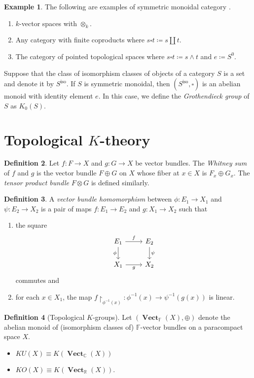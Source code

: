 \documentclass[10pt,letterpaper,cm]{nupset}
\theoremstyle{definition}
\newtheorem{definition}{Definition}[section]
\newtheorem{exmp}[definition]{Example}
\theoremstyle{theorem}
\theoremstyle{remark}
\newcommand{\C}{\mathbb C}
\newcommand{\F}{\mathbb F}
\newcommand{\R}{\mathbb R}
\newcommand{\1}{\mathbf{1}}
\newcommand{\0}{\vec 0}
\DeclareMathOperator{\iso}{iso}
\DeclareMathOperator{\vect}{\mathbf{Vect}}
\begin{document}
\begin{exmp} The following are examples of symmetric monoidal category	.
\begin{enumerate}
\item $k$-vector spaces with $\otimes_k$.
\item Any category with finite coproducts where $s \square t\coloneqq s \amalg t$.
\item The category of pointed topological spaces where $s \square t \coloneqq s \wedge t $ and $e\coloneqq S^0$.
\end{enumerate} 
\end{exmp}

Suppose that the class of isomorphism classes of objects of a category $S$ is a set and denote it by $S^{\iso}$. If $S$ is symmetric monoidal, then $\left(S^{\iso}, \square\right)$ is an abelian monoid with identity element $e$. In this case, we define the \textit{Grothendieck group} of $S$ as $K_0(S)$.

\section{Topological $K$-theory}

\begin{definition}
Let $f: F \to X$ and $g: G \to X$ be vector bundles. The \textit{Whitney sum} of $f$ and $g$ is the vector bundle $F \oplus G$ on $X$ whose fiber at $x \in X$ is $F_x \oplus G_x$.  The \textit{tensor product bundle} $F \otimes G$ is defined similarly.
\end{definition}

\begin{definition}
A \textit{vector bundle homomorphism} between $\phi : E_1 \to X_1$ and $\psi : E_2 \to X_2$ is a pair of maps $f: E_1 \to E_2$ and $g: X_1 \to X_2$ such that
\begin{enumerate}[label=(\roman*)]
\item the square
\[
\begin{tikzcd}
E_1 \arrow[r, "f"] \arrow[d, "\phi"'] & E_2 \arrow[d, "\psi"] \\
X_1 \arrow[r, "g"'] & X_2
\end{tikzcd}
\] commutes and
\item for each $x \in X_1$, the map $f \restriction_{\phi^{{-1}}(x)} : \phi^{{-1}}(x) \to \psi^{{-1}}(g(x))$ is linear.
\end{enumerate}
\end{definition}

\begin{definition}[Topological $K$-groups]
Let $\left(\vect_{\F}(X), \oplus\right)$ denote the abelian monoid of (isomorphism classes of) $\F$-vector bundles on a paracompact space $X$. 
\begin{itemize}
\item $KU(X) \equiv K(\vect_{\C}(X))$ 
\item $KO(X) \equiv K(\vect_{\R}(X)).$
\end{itemize}
\end{definition}
\end{document}
